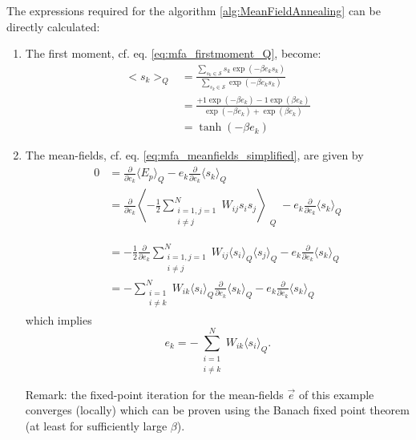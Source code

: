 The expressions required for the algorithm \ref{alg:MeanFieldAnnealing} can be directly
calculated: 
\begin{enumerate}
 \item The first moment, cf. eq. \eqref{eq:mfa_firstmoment_Q}, become: 
    \begin{align} 
      \big< s_k \big>_Q &= \frac{\sum\limits_{s_k \in \mathcal{S}} s_k \exp(-\beta e_k s_k)}{
					\sum\limits_{s_k \in \mathcal{S}} \exp(-\beta e_k s_k)} \\
			&= \frac{+1 \exp(-\beta e_k) -1 \exp(\beta e_k)}{\exp(-\beta e_k) + \exp(\beta e_k)} \nonumber \\
			&= \tanh(-\beta e_k) \nonumber
    \end{align}
 \item The mean-fields, cf. eq. \eqref{eq:mfa_meanfields_simplified}, are given by 
  \begin{align}
    0 &= \frac{\partial}{\partial e_k}\langle E_p\rangle _Q 
		- e_k \frac{\partial}{\partial e_k} \langle s_k\rangle _Q \\
     &= \frac{\partial}{\partial e_k}\left \langle -\frac{1}{2} 
	  \sum\limits_{\substack{i=1,j=1 \\ i\ne j}}^N W_{ij} s_i s_j \right \rangle_{\substack{Q \\ {} \\ {} \\ {}}} 
		- e_k \frac{\partial}{\partial e_k} \langle s_k\rangle_Q \nonumber \\
     &=  -\frac{1}{2} 
	  \frac{\partial}{\partial e_k} \sum\limits_{\substack{i=1,j=1 \\ i\ne j}}^N W_{ij} \langle s_i \rangle_Q \langle s_j \rangle_Q 
		- e_k \frac{\partial}{\partial e_k} \langle s_k \rangle_Q \nonumber \\
     &= -  \sum\limits_{\substack{i=1 \\ i\ne k}}^N W_{ik} \langle s_i \rangle_Q \frac{\partial}{\partial e_k} \langle s_k \rangle_Q 
		- e_k \frac{\partial}{\partial e_k} \langle s_k\rangle _Q \nonumber
  \end{align}
  which implies
  \begin{equation}
   e_k = -  \sum\limits_{\substack{i=1 \\ i\ne k}}^N W_{ik} \langle s_i \rangle_Q.
  \end{equation}

  Remark: the fixed-point iteration for the mean-fields $\vec{e}$ of this example converges (locally)
  which can be proven
using the 
  Banach fixed point theorem (at least for sufficiently large $\beta$).
\end{enumerate}


